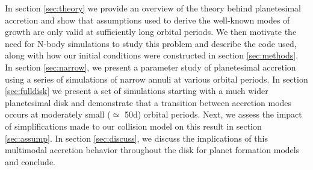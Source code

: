 \documentclass[twocolumn]{aastex63}
\begin{document}

%

In section \ref{sec:theory} we provide an overview of the theory
behind planetesimal accretion and show that assumptions used to derive
the well-known modes of growth are only valid at sufficiently long
orbital periods. We then motivate the need for N-body simulations to
study this problem and describe the code used, along with how our
initial conditions were constructed in section \ref{sec:methods}. In
section \ref{sec:narrow}, we present a parameter study of planetesimal
accretion using a series of simulations of narrow annuli at various
orbital periods. In section \ref{sec:fulldisk} we present a set of simulations starting with a much wider planetesimal disk and demonstrate that a transition between accretion modes occurs at moderately small ($\simeq$ 50d) orbital periods. Next, we assess the impact of simplifications made to our collision model on this result in section \ref{sec:assump}. In section \ref{sec:discuss}, we discuss the implications of this multimodal accretion behavior throughout the disk for planet formation models and conclude.
\end{document}
